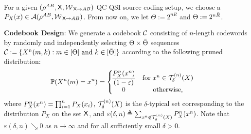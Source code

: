 
For a given $(\rho^{AB},\sfX,\calW_{\!\ \sfX \rightarrow AB})$ QC-QSI source coding setup, we choose a $P_X(x) \in \mathcal{A}(\rho^{AB},\mathcal{W}_{\!\ \mathsf{X} \rightarrow AB})$. From now on, we let $\Theta := 2^{nR}$  and $\Theta := 2^{n\bar{R}}$.

\noindent \textbf{Codebook Design}: We generate a codebook $\mathcal{C}$ consisting of $n$-length codewords by randomly and independently selecting $\Theta\times\bar{\Theta}$ sequences $\mathcal{C}:= \{X^n(m,k): m\in [\Theta]\text{ and } k\in [\bar{\Theta}]\}$ according to the following pruned distribution:
 \begin{align}\label{def:qc_distribution}
     &\mathbb{P}(X^n(m) = x^n) = \left\{\!\!\!\!\begin{array}{cc}
          \dfrac{P_X^n(x^n)}{(1-\varepsilon)}  & \mbox{for} \; x^n \in \mathcal{T}_{{\delta}}^{(n)}({X})\\
           0 &  \mbox{otherwise,}
     \end{array} \right. \!\!
 \end{align} 
  where $ P_X^n(x^n) = \prod_{i=1}^n P_X(x_i)$, $\mathcal{T}_{{\delta}}^{(n)}({X})$ is the $\delta$-typical set corresponding to the distribution $P_X$ on the set $\mathsf{X}$, and $\varepsilon(\delta,n) \triangleq \sum_{x^n \not \in \mathcal{T}_{{\delta}}^{(n)}({X})} P_X^n(x^n)$. Note that $\varepsilon(\delta,n) \searrow 0$ as $n \rightarrow \infty$ and for all sufficiently small $\delta > 0$. 
  
